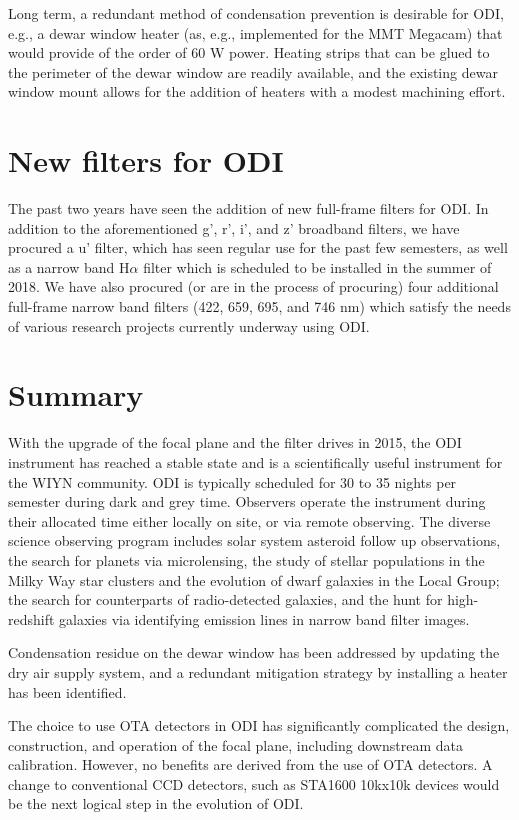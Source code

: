 \documentclass[]{spieman}
\begin{document}
Long term, a redundant method of condensation prevention is desirable for
ODI, e.g., a dewar window heater (as, e.g., implemented for the MMT 
Megacam\cite{McLeod2015}) that would provide of the
order of 60 W power. Heating strips that can be glued to the perimeter of the
dewar window are readily available, and the existing dewar window mount allows
for the addition of heaters with a modest machining effort.

\section{New filters for ODI}

The past two years have seen the addition of new full-frame filters for ODI.  In
addition to the aforementioned g', r', i', and z' broadband filters, we have
procured a u' filter, which has seen regular use for the past few semesters, as
well as a narrow band H$\alpha$ filter which is scheduled to be installed in the
summer of 2018. We have also procured (or are in the process of procuring) four
additional full-frame narrow band filters (422, 659, 695, and 746 nm) which
satisfy the needs of various research projects currently underway using ODI.

\section{Summary}

With the upgrade of the focal plane and the filter drives in 2015, the ODI
instrument has reached a stable state and is a scientifically useful instrument
for the WIYN community. ODI is typically scheduled for 30 to 35 nights per
semester during dark and grey time. Observers operate the instrument during
their allocated time either locally on site, or via remote observing. The
diverse science observing program includes solar system asteroid follow up
observations, the search for planets via microlensing, the study of stellar
populations in the  Milky Way star clusters and the evolution of dwarf galaxies
in the Local Group; the search for  counterparts of radio-detected galaxies, and
the hunt for high-redshift galaxies via identifying emission lines in narrow
band filter images.

Condensation residue on the dewar window has been addressed by updating the dry
air supply system, and a redundant  mitigation strategy by installing a heater
has been identified.

The choice to use  OTA detectors in ODI has significantly complicated the
design, construction, and operation of the focal plane, including downstream
data calibration. However, no benefits are derived from the use of OTA
detectors.  A change to conventional CCD detectors, such as STA1600 10kx10k
devices would be the next logical step in the evolution of ODI.



 

\end{document}
